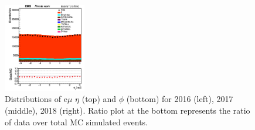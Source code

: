 \documentclass{cernatlasnote}
\begin{document}
\begin{figure}[htp]
 \includegraphics[width=0.32\textwidth]{images/emu_channel/2018/18_Range_0pt7_1pt3/Dilepton_phi_filter_M20_MET40_Linear.png}
 \caption{Distributions of e$\mu$ $\eta$ (top) and $\phi$ (bottom) for 2016 (left), 2017 (middle), 2018 (right). Ratio plot at the bottom represents the ratio of data over total MC simulated events.}
 \label{fig:mu_dist}
  \end{figure}
\end{document}
